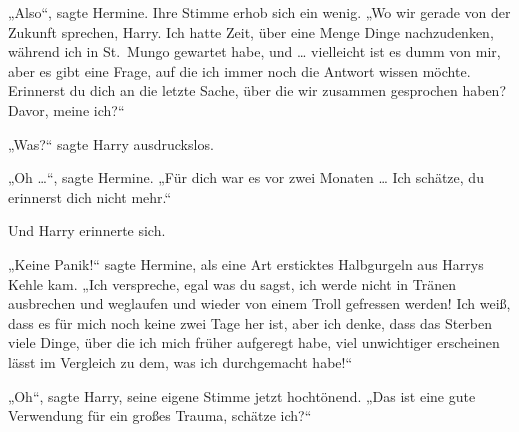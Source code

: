 „Also“, sagte Hermine. Ihre Stimme erhob sich ein wenig.
„Wo wir gerade von der Zukunft sprechen, Harry. Ich hatte Zeit, über eine Menge Dinge nachzudenken, während ich in St.~Mungo gewartet habe, und … vielleicht ist es dumm von mir, aber es gibt eine Frage, auf die ich immer noch die Antwort wissen möchte. Erinnerst du dich an die letzte Sache, über die wir zusammen gesprochen haben? Davor, meine ich?“

„Was?“ sagte Harry ausdruckslos.

„Oh …“, sagte Hermine.
„Für dich war es vor zwei Monaten … Ich schätze, du erinnerst dich nicht mehr.“

Und Harry erinnerte sich.

„Keine Panik!“ sagte Hermine, als eine Art ersticktes Halbgurgeln aus Harrys Kehle kam.
„Ich verspreche, egal was du sagst, ich werde nicht in Tränen ausbrechen und weglaufen und wieder von einem Troll gefressen werden! Ich weiß, dass es für mich noch keine zwei Tage her ist, aber ich denke, dass das Sterben viele Dinge, über die ich mich früher aufgeregt habe, viel unwichtiger erscheinen lässt im Vergleich zu dem, was ich durchgemacht habe!“

„Oh“, sagte Harry, seine eigene Stimme jetzt hochtönend.
„Das ist eine gute Verwendung für ein großes Trauma, schätze ich?“

